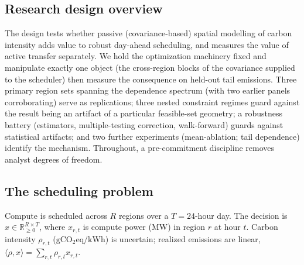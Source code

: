\documentclass[10pt,twocolumn]{article}
\newcommand{\R}{\mathbb{R}}
\newcommand{\gco}{\mathrm{gCO_2eq/kWh}}
\begin{document}
\subsection{Research design overview}
The design tests whether passive (covariance-based) spatial modelling of carbon
intensity adds value to robust day-ahead scheduling, and measures the value of active
transfer separately. We hold the optimization
machinery fixed and manipulate exactly one object (the cross-region blocks of the
covariance supplied to the scheduler) then measure the consequence on held-out
tail emissions. Three primary region sets spanning the dependence spectrum (with two
earlier panels corroborating) serve as replications; three nested constraint regimes
guard against the result being an
artifact of a particular feasible-set geometry; a robustness battery (estimators,
multiple-testing correction, walk-forward) guards against statistical artifacts; and
two further experiments (mean-ablation; tail dependence) identify the mechanism.
Throughout, a pre-commitment discipline removes analyst degrees of freedom.

\subsection{The scheduling problem}
Compute is scheduled across $R$ regions over a $T=24$-hour day. The decision is
$x\in\R^{R\times T}_{\ge0}$, where $x_{r,t}$ is compute power (MW) in region $r$ at
hour $t$. Carbon intensity $\rho_{r,t}$ ($\gco$) is uncertain; realized emissions
are linear, $\langle\rho,x\rangle=\sum_{r,t}\rho_{r,t}x_{r,t}$.
\end{document}

